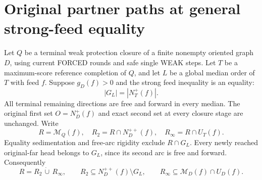 \section{Original partner paths at general strong-feed equality}
\label{sec:weak-equality-original-partner-paths}

Let $Q$ be a terminal weak protection closure of a finite nonempty
oriented graph $D$, using current FORCED rounds and safe single WEAK
steps. Let $T$ be a maximum-score reference completion of $Q$, and
let $L$ be a global median order of $T$ with feed $f$.
Suppose $g_D(f)>0$ and the strong feed inequality is an equality:
\[
 |G_L|=|N_T^+(f)|.
\]
All terminal remaining directions are free and forward in every median.
The original first set $O=N_D^+(f)$ and exact second set at every
closure stage are unchanged. Write
\[
 R=\mathcal M_Q(f),\quad
 R_2=R\cap N_D^{++}(f),\quad
 R_\infty=R\cap U_T(f).
\]
Equality sedimentation and free-arc rigidity exclude $R\cap G_L$.
Every newly reached original-far head belongs to $G_L$, since its
second arc is free and forward. Consequently
\[
 R=R_2\,\dot\cup\,R_\infty,
 \qquad R_2\subseteq N_D^{++}(f)\setminus G_L,
 \qquad R_\infty\subseteq\mathcal M_D(f)\cap U_D(f).
 \tag{WP1}\label{eq:weak-equality-partner-partition}
\]

